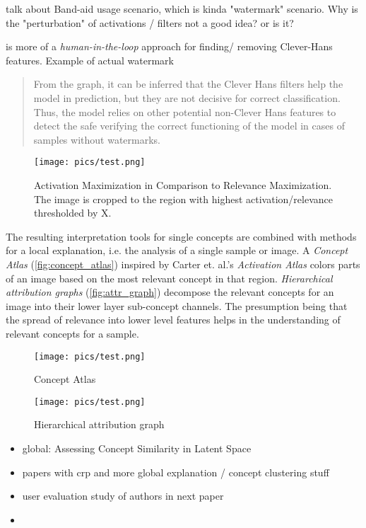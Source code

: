 talk about Band-aid usage scenario, which is kinda "watermark" scenario. Why is the "perturbation" of activations / filters not a good idea? or is it?

is more of a \textit{human-in-the-loop} approach for finding/ removing Clever-Hans features. Example of actual watermark
\begin{quote}
From the graph, it can be inferred that the Clever Hans filters help the model in prediction, but they are not decisive for correct classification. Thus, the model relies on other potential non-Clever Hans features to detect the safe verifying the correct functioning of the model in cases of samples without watermarks.
\end{quote}

\begin{figure}[htbp]
    \centering
	\texttt{[image: pics/test.png]}
    \caption{Activation Maximization in Comparison to Relevance Maximization. The image is cropped to the region with highest activation/relevance thresholded by X. }
    \label{fig:act_rel_max}
\end{figure}

The resulting interpretation tools for single concepts are combined with methods for a local explanation, i.e. the analysis of a single sample or image. A \textit{Concept Atlas} (\autoref{fig:concept_atlas}) inspired by Carter et. al.'s \textit{Activation Atlas}  colors parts of an image based on the most relevant concept in that region. \textit{Hierarchical attribution graphs} (\autoref{fig:attr_graph}) decompose the relevant concepts for an image into their lower layer sub-concept channels. The presumption being that the spread of relevance into lower level features helps in the understanding of relevant concepts for a sample.

\begin{figure}[htbp]
    \centering
	\texttt{[image: pics/test.png]}
    \caption{Concept Atlas}
    \label{fig:concept_atlas}
\end{figure}

\begin{figure}[htbp]
    \centering
	\texttt{[image: pics/test.png]}
    \caption{Hierarchical attribution graph}
    \label{fig:attr_graph}
\end{figure}

\begin{itemize}
    \item global: Assessing Concept Similarity in Latent Space
    \item papers with crp and more global explanation / concept clustering stuff 
\cite{Vielhaben2022,Vielhaben2023,Dreyer2023,Dreyer2023a,Fel2023,Fel2023a,Pahde2023}
    \item user evaluation study of authors in next paper \cite{Achtibat2023}
    \item 
\end{itemize}


